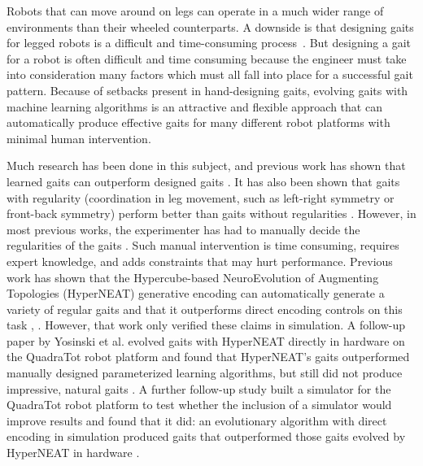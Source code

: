 Robots that can move around on legs can operate in a much wider range of environments than their wheeled counterparts. A downside is that designing gaits for legged robots is a difficult and time-consuming process~\cite{ridder storm, wetter green}. 
But designing a gait for a robot is often difficult and time consuming because the engineer must take into consideration many factors which must all fall into place for a successful gait pattern. 
Because of setbacks present in hand-designing gaits, evolving gaits with machine learning algorithms is an attractive and flexible approach that can automatically produce effective gaits for many different robot platforms with minimal human intervention. 

Much research has been done in this subject, and previous work has shown that learned gaits can outperform designed gaits \cite{valsalam:mii,kohl:stone,hornby1,hornby2}. %
It has also been shown that gaits with regularity (coordination in leg movement, such as left-right symmetry or front-back symmetry) perform better than gaits without regularities \cite{valsalam:mii,clune2,clune1,clune3}. %
However, in most previous works, the experimenter has had to manually decide the regularities of the gaits \cite{valsalam:mii,tellez,beer,raibert} . %
Such manual intervention is time consuming, requires expert knowledge, and adds constraints that may hurt performance. 
Previous work has shown that the Hypercube-based NeuroEvolution of Augmenting Topologies (HyperNEAT) generative encoding \cite{stanley1} can automatically generate a variety of regular gaits and that it outperforms direct encoding controls on this task \cite{clune1}, \cite{clune2}. 
However, that work only verified these claims in simulation. 
A follow-up paper by Yosinski et al. evolved gaits with HyperNEAT directly in hardware on the QuadraTot robot platform and found that HyperNEAT's gaits outperformed manually designed parameterized learning algorithms, but still did not produce impressive, natural gaits \cite{yos:clune}. 
A further follow-up study built a simulator for the QuadraTot robot platform to test whether the inclusion of a simulator would improve results and found that it did:  an evolutionary algorithm with direct encoding in simulation produced gaits that outperformed those gaits evolved by HyperNEAT in hardware \cite{glette}. %
